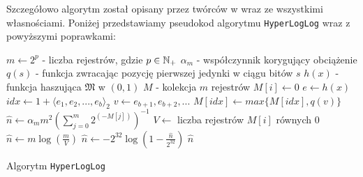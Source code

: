 Szczegółowo algorytm został opisany przez twórców w \cite{hll} wraz ze wszystkimi własnościami. Poniżej przedstawiamy pseudokod algorytmu \texttt{HyperLogLog} wraz z powyższymi poprawkami:
\newline
\begin{algorithm}
    \begin{algorithmic}
    \State $m \gets 2^p$ - liczba rejestrów, gdzie $p \in {\mathbb{N}}_{+}$
    \State ${\alpha}_m $ - współczynnik korygujący obciążenie
    \State $q(s) $ -  funkcja zwracając pozycję pierwszej jedynki w ciągu bitów $s$ 
    \State $h(x)  $  - funkcja haszująca $\mathfrak{M}$ w $(0, 1)$
    \State $M $  - kolekcja $m$ rejestrów 
    \newline
        \State $M[i] \gets 0$
    \EndFor
    \newline
        \State $e \gets h(x)$
        \State $idx \gets 1 + {{\langle}e_1, e_2, ..., e_b{\rangle}}_2$
        \State $v \gets e_{b+1}, e_{b+2}, ...$
        \State $M[idx] \gets max\{M[idx], q(v)\}$
    \EndFunction
    \newline
        \State $\hat{n} \gets {\alpha}_{m}{m}^2(\sum_{j=0}^{m} 2^{(-M[j])})^{-1}$
            \State $V \gets $ liczba rejestrów $M[i]$ równych $0$
                \State $\hat{n} \gets {m}\log(\frac{m}{V})$
            \EndIf
            \State $\hat{n} \gets -2^{32}\log(1 - \frac{\hat{n}}{2^{32}})$
        \EndIf
        \State \Return $\hat{n}$
    \EndFunction
    
    \end{algorithmic}
    \caption{Algorytm \texttt{HyperLogLog}}
\end{algorithm}


